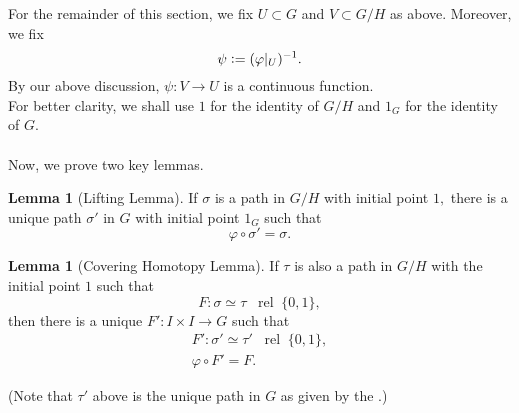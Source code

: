 \documentclass[12pt]{article}
\theoremstyle{definition}
\numberwithin{thm}{section}
\newtheorem{lem}[thm]{Lemma}
\newcommand{\rel}{\;\;\operatorname{rel}\;}
\begin{document}
For the remainder of this section, we fix $U \subset G$ and $V \subset G/H$ as above. Moreover, we fix
\begin{equation*} 
	\psi \vcentcolon= (\varphi|_U)^{-1}.
\end{equation*}
By our above discussion, $\psi:V \to U$ is a continuous function.\\
For better clarity, we shall use $1$ for the identity of $G/H$ and $1_G$ for the identity of $G.$ \\~\\
Now, we prove two key lemmas. 
\begin{lem}[Lifting Lemma] \label{lem:lift}
	If $\sigma$ is a path in $G/H$ with initial point $1,$ there is a unique path $\sigma'$ in $G$ with initial point $1_G$ such that
	\begin{equation*} 
		\varphi \circ \sigma' = \sigma.
	\end{equation*}
\end{lem}
\begin{lem}[Covering Homotopy Lemma] \label{lem:covhomot}
	If $\tau$ is also a path in $G/H$ with the initial point $1$ such that
	\begin{equation*} 
		F: \sigma \simeq \tau \rel \{0, 1\},
	\end{equation*}
	then there is a unique $F':I\times I \to G$ such that
	\begin{align*} 
		F' : \sigma' \simeq \tau' \rel \{0, 1\},\\
		\varphi \circ F' = F.
	\end{align*}
\end{lem}
(Note that $\tau'$ above is the unique path in $G$ as given by the .)
\end{document}
